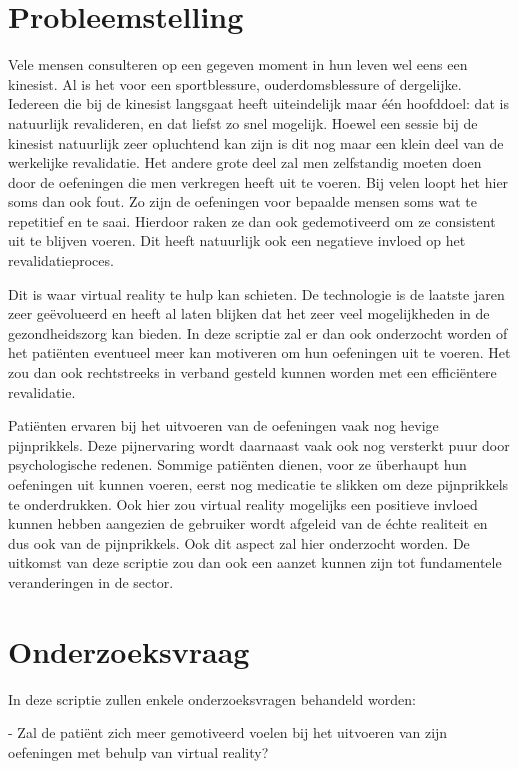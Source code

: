\section{Probleemstelling}
\label{sec:probleemstelling}
Vele mensen consulteren op een gegeven moment in hun leven wel eens een kinesist. Al is het voor een sportblessure, ouderdomsblessure of dergelijke. Iedereen die bij de kinesist langsgaat heeft uiteindelijk maar één hoofddoel: dat is natuurlijk revalideren, en dat liefst zo snel mogelijk. Hoewel een sessie bij de kinesist natuurlijk zeer opluchtend kan zijn is dit nog maar een klein deel van de werkelijke revalidatie. Het andere grote deel zal men zelfstandig moeten doen door de oefeningen die men verkregen heeft uit te voeren. Bij velen loopt het hier soms dan ook fout. Zo zijn de oefeningen voor bepaalde mensen soms wat te repetitief en te saai. Hierdoor raken ze dan ook gedemotiveerd om ze consistent uit te blijven voeren. Dit heeft natuurlijk ook een negatieve invloed op het revalidatieproces. 

Dit is waar virtual reality te hulp kan schieten. De technologie is de laatste jaren zeer geëvolueerd en heeft al laten blijken dat het zeer veel mogelijkheden in de gezondheidszorg kan bieden. In deze scriptie zal er dan ook onderzocht worden of het patiënten eventueel meer kan motiveren om hun oefeningen uit te voeren. Het zou dan ook rechtstreeks in verband gesteld kunnen worden met een efficiëntere revalidatie.

Patiënten ervaren bij het uitvoeren van de oefeningen vaak nog hevige pijnprikkels. Deze pijnervaring wordt daarnaast vaak ook nog versterkt puur door psychologische redenen. Sommige patiënten dienen, voor ze überhaupt hun oefeningen uit kunnen voeren, eerst nog medicatie te slikken om deze pijnprikkels te onderdrukken. Ook hier zou virtual reality mogelijks een positieve invloed kunnen hebben aangezien de gebruiker wordt afgeleid van de échte realiteit en dus ook van de pijnprikkels. Ook dit aspect zal hier onderzocht worden. De uitkomst van deze scriptie zou dan ook een aanzet kunnen zijn tot fundamentele veranderingen in de sector.


\section{Onderzoeksvraag}
\label{sec:onderzoeksvraag}

In deze scriptie zullen enkele onderzoeksvragen behandeld worden:

- Zal de patiënt zich meer gemotiveerd voelen bij het uitvoeren van zijn oefeningen met behulp van virtual reality?

